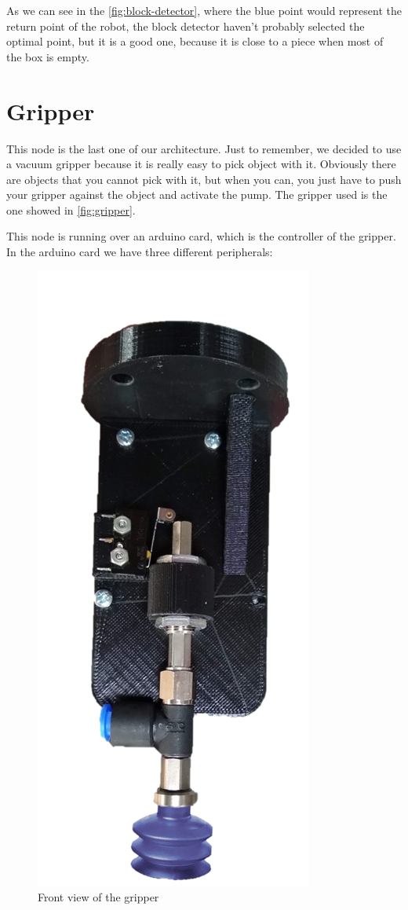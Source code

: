 			As we can see in the \autoref{fig:block-detector}, where the blue point would represent the return point of the robot, the block detector haven't probably selected the optimal point, but it is a good one, because it is close to a piece when most of the box is empty.
		
	\section{Gripper}
		
		This node is the last one of our architecture. Just to remember, we decided to use a vacuum gripper because it is really easy to pick object with it. Obviously there are objects that you cannot pick with it, but when you can, you just have to push your gripper against the object and activate the pump. The gripper used is the one showed in \autoref{fig:gripper}.
		
		This node is running over an arduino card, which is the controller of the gripper. In the arduino card we have three different peripherals:
		
			\begin{figure}[H]
				\centering
				\includegraphics[width=0.7\linewidth]{Images/Gripper}
				\caption[Gripper]{Front view of the gripper}
				\label{fig:gripper}
			\end{figure}
			
